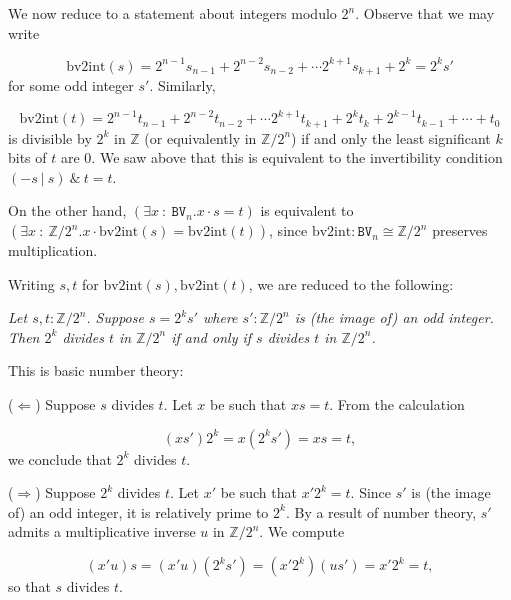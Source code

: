 \documentclass[11pt]{article}
\begin{document}
We now reduce to a statement about integers modulo $2^n$. Observe that we may write

\[
\text{bv2int}(s) = 2^{n-1}s_{n-1} + 2^{n-2}s_{n-2} + \cdots 2^{k+1}s_{k+1} + 2^k = 2^ks'
\]
for some odd integer $s'$. Similarly,

\[
\text{bv2int}(t) = 2^{n-1}t_{n-1} + 2^{n-2}t_{n-2} + \cdots 2^{k+1}t_{k+1} + 2^kt_k + 2^{k-1}t_{k-1} + \cdots + t_0
\]
is divisible by $2^k$ in $\mathbb{Z}$ (or equivalently in $\mathbb{Z}/2^n$) if and only the least significant $k$ bits of $t$ are $0$. We saw above that this is equivalent to the invertibility condition $(-s\ |\ s)\ \&\ t = t$.

On the other hand, $(\exists x\ :\ \texttt{BV}_n. x \cdot s = t)$ is equivalent to $(\exists x\ :\ \mathbb{Z}/2^n. x \cdot \text{bv2int}(s) = \text{bv2int}(t))$, since $\text{bv2int} : \texttt{BV}_n \cong \mathbb{Z}/2^n$ preserves multiplication.

Writing $s, t$ for $\text{bv2int}(s), \text{bv2int}(t)$, we are reduced to the following:

\emph{Let $s, t : \mathbb{Z}/2^n$. Suppose $s = 2^k s'$ where $s' : \mathbb{Z}/2^n$ is (the image of) an odd integer. Then $2^k$ divides $t$ in $\mathbb{Z}/2^n$ if and only if $s$ divides $t$ in $\mathbb{Z}/2^n$.}

This is basic number theory:

($\Leftarrow$) Suppose $s$ divides $t$. Let $x$ be such that $x s = t$. From the calculation

\[
 (xs')2^k = x(2^ks') = xs = t,
\]
we conclude that $2^k$ divides $t$.

($\Rightarrow$) Suppose $2^k$ divides $t$. Let $x'$ be such that $x' 2^k = t$. Since $s'$ is (the image of) an odd integer, it is relatively prime to $2^k$. By a result of number theory, $s'$ admits a multiplicative inverse $u$ in $\mathbb{Z}/2^n$. We compute

\[
(x'u)s = (x'u)(2^ks') = (x'2^k)(us') = x'2^k = t,
\]
so that $s$ divides $t$.
\end{document}
